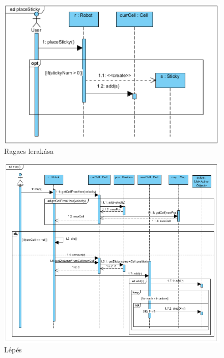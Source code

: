 \begin{figure}[!htbp]
	\begin{center}
		\includegraphics[width=13cm]{./chapters/chapter05/placestickysequence.png}
		\caption{Ragacs lerakása}
	\end{center}
\end{figure}

\clearpage

\begin{figure}[!htbp]
	\begin{center}
		\includegraphics[width=18cm]{./chapters/chapter05/stepsequence.png}
		\caption{Lépés}
	\end{center}
\end{figure}

\clearpage

